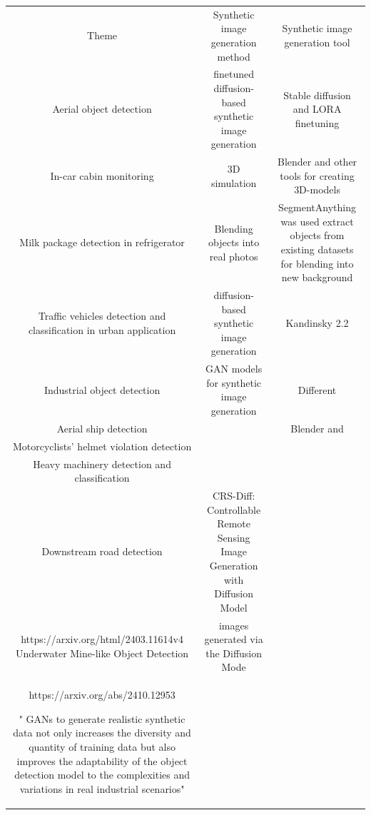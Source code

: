     \begin{table}[!h]
        \begin{tabular}{c|c|c}
        Theme & Synthetic image generation method &  Synthetic image generation tool   \\
        Aerial object detection  & finetuned diffusion-based synthetic image generation & Stable diffusion and LORA finetuning\\
        In-car cabin monitoring & 3D simulation & Blender and other tools for creating 3D-models\\
        Milk package detection in refrigerator & Blending objects into real photos & SegmentAnything was used extract objects from existing datasets for blending into new background\\
        Traffic vehicles detection and classification in urban application & diffusion-based synthetic image generation & Kandinsky 2.2\\
        Industrial object detection &  GAN models for synthetic image generation & Different \\
        Aerial ship detection& &Blender and\\
        Motorcyclists' helmet violation detection & &\\
        Heavy machinery detection and classification & & \\
        Downstream road detection & CRS-Diff: Controllable Remote Sensing Image Generation with Diffusion Model & \\ 
    
        https://arxiv.org/html/2403.11614v4
        Underwater Mine-like Object Detection & images generated via the Diffusion Mode & \\ 
    
        https://arxiv.org/abs/2410.12953
    
        " GANs to generate realistic synthetic data not only increases the diversity and quantity of training data but also improves the adaptability of the object detection model to the complexities and variations in real industrial scenarios" 
        \end{tabular}
        \end{table}

